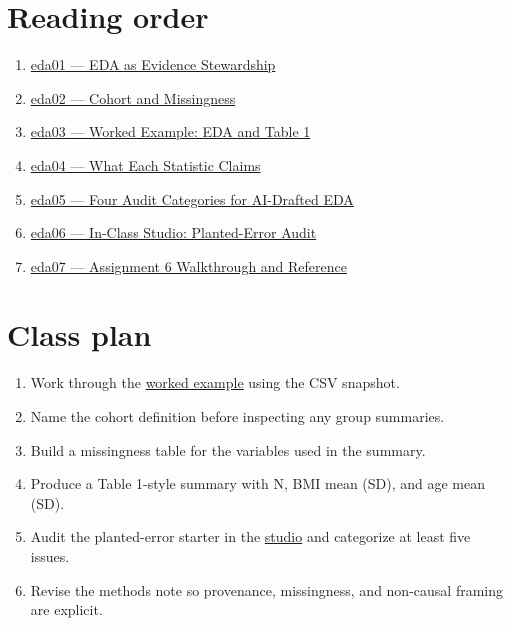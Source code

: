 \documentclass[
  letterpaper,
  DIV=11,
  numbers=noendperiod,
  oneside]{scrreprt}
\providecommand{\tightlist}{%
  \setlength{\itemsep}{0pt}\setlength{\parskip}{0pt}}
\begin{document}
\section*{Reading order}\label{reading-order-1}


\begin{enumerate}
\def\labelenumi{\arabic{enumi}.}
\tightlist
\item
  \href{eda01-overview-and-goals.qmd}{eda01 --- EDA as Evidence
  Stewardship}
\item
  \href{eda02-cohort-and-missingness.qmd}{eda02 --- Cohort and
  Missingness}
\item
  \href{eda03-worked-example.qmd}{eda03 --- Worked Example: EDA and
  Table 1}
\item
  \href{eda04-descriptive-statistics-claims.qmd}{eda04 --- What Each
  Statistic Claims}
\item
  \href{eda05-ai-audit-categories.qmd}{eda05 --- Four Audit Categories
  for AI-Drafted EDA}
\item
  \href{eda06-studio-planted-errors.qmd}{eda06 --- In-Class Studio:
  Planted-Error Audit}
\item
  \href{eda07-assignment-a6-and-reference.qmd}{eda07 --- Assignment 6
  Walkthrough and Reference}
\end{enumerate}

\section*{Class plan}\label{class-plan-1}


\begin{enumerate}
\def\labelenumi{\arabic{enumi}.}
\tightlist
\item
  Work through the \href{eda03-worked-example.qmd}{worked example} using
  the CSV snapshot.
\item
  Name the cohort definition before inspecting any group summaries.
\item
  Build a missingness table for the variables used in the summary.
\item
  Produce a Table 1-style summary with N, BMI mean (SD), and age mean
  (SD).
\item
  Audit the planted-error starter in the
  \href{eda06-studio-planted-errors.qmd}{studio} and categorize at least
  five issues.
\item
  Revise the methods note so provenance, missingness, and non-causal
  framing are explicit.
\end{enumerate}
\end{document}
